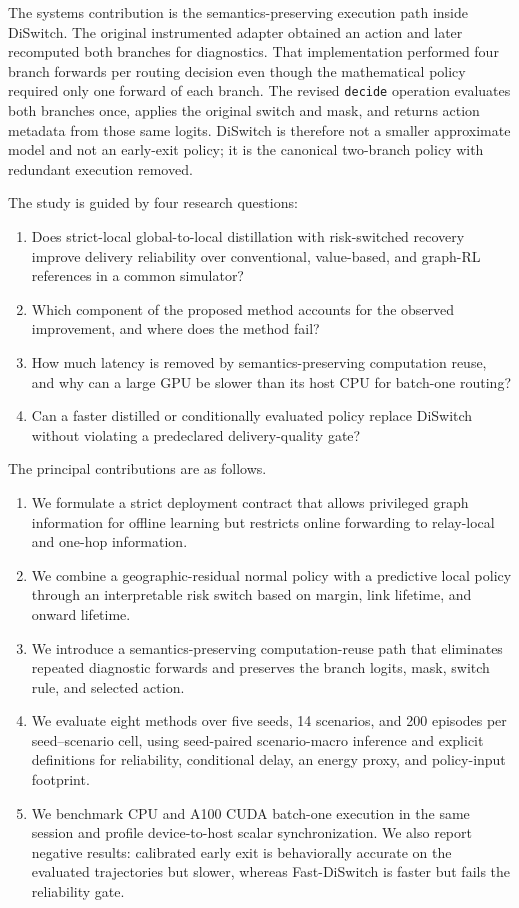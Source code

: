 \documentclass{ieeeaccess}
\newcommand{\DS}{DiSwitch}
\newcommand{\FastDS}{Fast-DiSwitch}
\begin{document}
The systems contribution is the semantics-preserving execution path inside \DS{}. The original instrumented adapter obtained an action and later recomputed both branches for diagnostics. That implementation performed four branch forwards per routing decision even though the mathematical policy required only one forward of each branch. The revised \texttt{decide} operation evaluates both branches once, applies the original switch and mask, and returns action metadata from those same logits. \DS{} is therefore not a smaller approximate model and not an early-exit policy; it is the canonical two-branch policy with redundant execution removed.

The study is guided by four research questions:
\begin{enumerate}[leftmargin=*]
\item Does strict-local global-to-local distillation with risk-switched recovery improve delivery reliability over conventional, value-based, and graph-RL references in a common simulator?
\item Which component of the proposed method accounts for the observed improvement, and where does the method fail?
\item How much latency is removed by semantics-preserving computation reuse, and why can a large GPU be slower than its host CPU for batch-one routing?
\item Can a faster distilled or conditionally evaluated policy replace \DS{} without violating a predeclared delivery-quality gate?
\end{enumerate}

The principal contributions are as follows.
\begin{enumerate}[leftmargin=*]
\item We formulate a strict deployment contract that allows privileged graph information for offline learning but restricts online forwarding to relay-local and one-hop information.
\item We combine a geographic-residual normal policy with a predictive local policy through an interpretable risk switch based on margin, link lifetime, and onward lifetime.
\item We introduce a semantics-preserving computation-reuse path that eliminates repeated diagnostic forwards and preserves the branch logits, mask, switch rule, and selected action.
\item We evaluate eight methods over five seeds, 14 scenarios, and 200 episodes per seed--scenario cell, using seed-paired scenario-macro inference and explicit definitions for reliability, conditional delay, an energy proxy, and policy-input footprint.
\item We benchmark CPU and A100 CUDA batch-one execution in the same session and profile device-to-host scalar synchronization. We also report negative results: calibrated early exit is behaviorally accurate on the evaluated trajectories but slower, whereas \FastDS{} is faster but fails the reliability gate.
\end{enumerate}
\end{document}
